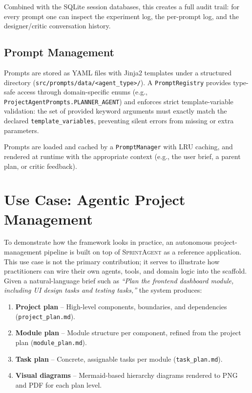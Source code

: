 \documentclass[11pt, a4paper]{article}
\newcommand{\sprintagent}{\textsc{SprintAgent}}
\begin{document}
Combined with the SQLite session databases, this creates a full audit
trail: for every prompt one can inspect the experiment log, the
per-prompt log, and the designer/critic conversation history.

\subsection{Prompt Management}
\label{sec:prompts}

Prompts are stored as YAML files with Jinja2 templates under a
structured directory (\texttt{src/prompts/data/<agent\_type>/}).  A
\texttt{PromptRegistry} provides type-safe access through
domain-specific enums (e.g., \texttt{ProjectAgentPrompts.PLANNER\_AGENT})
and enforces strict template-variable validation: the set of provided
keyword arguments must exactly match the declared
\texttt{template\_variables}, preventing silent errors from missing or
extra parameters.

Prompts are loaded and cached by a \texttt{PromptManager} with
LRU caching, and rendered at runtime with the appropriate context
(e.g., the user brief, a parent plan, or critic feedback).

\section{Use Case: Agentic Project Management}
\label{sec:usecase}

To demonstrate how the framework looks in practice, an autonomous
project-management pipeline is built on top of \sprintagent{} as a
reference application.  This use case is not the primary contribution;
it serves to illustrate how practitioners can wire their own agents,
tools, and domain logic into the scaffold.  Given a natural-language brief such as
\emph{``Plan the frontend dashboard module, including UI design tasks
and testing tasks,''} the system produces:

\begin{enumerate}[leftmargin=*]
  \item \textbf{Project plan} -- High-level components, boundaries, and
    dependencies (\texttt{project\_plan.md}).
  \item \textbf{Module plan} -- Module structure per component, refined
    from the project plan (\texttt{module\_plan.md}).
  \item \textbf{Task plan} -- Concrete, assignable tasks per module
    (\texttt{task\_plan.md}).
  \item \textbf{Visual diagrams} -- Mermaid-based hierarchy diagrams
    rendered to PNG and PDF for each plan level.
\end{enumerate}
\end{document}
